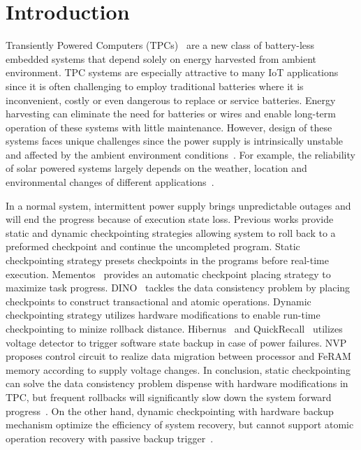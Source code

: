 \section{Introduction} \label{sec:introduction}
Transiently Powered Computers (TPCs)~\cite{Ma2015Architecture, ransford2013transiently, ransford2012mementos} are a new class of battery-less embedded systems that depend solely on energy harvested from ambient environment.
TPC systems are especially attractive to many IoT applications since it is often challenging to employ traditional batteries where it is inconvenient, costly or even dangerous to replace or service batteries. 
Energy harvesting can eliminate the need for batteries or wires and enable long-term operation of these systems with little maintenance.
However, design of these systems faces unique challenges since the power supply is intrinsically unstable and affected by the ambient environment conditions~\cite{Ma2015Architecture, ransford2013transiently,wang2014mppt}.
For example, the reliability of solar powered systems largely depends on the weather, location and environmental changes of different applications~\cite{Abas2015Solar, Alippi2011A, Malaver2014Development, Rojas2015Design}.

In a normal system, intermittent power supply brings unpredictable outages and will end the progress because of execution state loss.
Previous works provide static and dynamic checkpointing strategies allowing system to roll back to a preformed checkpoint and continue the uncompleted program.
Static checkpointing strategy presets checkpoints in the programs before real-time execution.
Mementos~\cite{ransford2012mementos} provides an automatic checkpoint placing strategy to maximize task progress.
DINO~\cite{} tackles the data consistency problem by placing checkpoints to construct transactional and atomic operations. 
Dynamic checkpointing strategy utilizes hardware modifications to enable run-time checkpointing to minize rollback distance. 
Hibernus~\cite{balsamo2015hibernus} and QuickRecall~\cite{} utilizes voltage detector to trigger software state backup in case of power failures. 
NVP~\cite{wang20123us} proposes control circuit to realize data migration between processor and FeRAM  memory according to supply voltage changes.
In conclusion, static checkpointing can solve the data consistency problem dispense with hardware modifications in TPC, but frequent rollbacks will significantly slow down the system forward progress~\cite{Ma2015Architecture}. 
On the other hand, dynamic checkpointing with hardware backup mechanism optimize the efficiency of system recovery, but cannot support atomic operation recovery with passive backup trigger~\cite{Alpaca}.  



